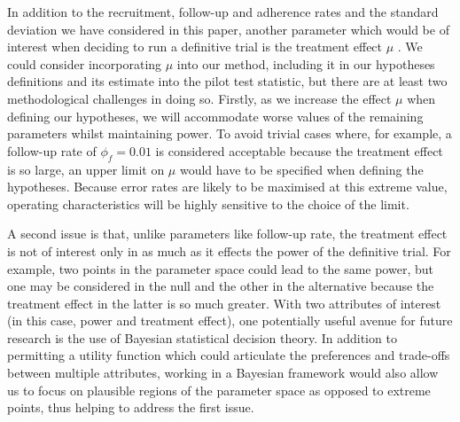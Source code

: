 \documentclass[AMA,STIX1COL]{WileyNJD-v2}
\begin{document}

In addition to the recruitment, follow-up and adherence rates and the standard deviation we have considered in this paper, another parameter which would be of interest when deciding to run a definitive trial is the treatment effect $\mu$ \cite{Wilson2015}. We could consider incorporating $\mu$ into our method, including it in our hypotheses definitions and its estimate into the pilot test statistic, but there are at least two methodological challenges in doing so. Firstly, as we increase the effect $\mu$ when defining our hypotheses, we will accommodate worse values of the remaining parameters whilst maintaining power. To avoid trivial cases where, for example, a follow-up rate of $\phi_f = 0.01$ is considered acceptable because the treatment effect is so large, an upper limit on $\mu$ would have to be specified when defining the hypotheses. Because error rates are likely to be maximised at this extreme value, operating characteristics will be highly sensitive to the choice of the limit.

A second issue is that, unlike parameters like follow-up rate, the treatment effect is not of interest only in as much as it effects the power of the definitive trial. For example, two points in the parameter space could lead to the same power, but one may be considered in the null and the other in the alternative because the treatment effect in the latter is so much greater. With two attributes of interest (in this case, power and treatment effect), one potentially useful avenue for future research is the use of Bayesian statistical decision theory. In addition to permitting a utility function which could articulate the preferences and trade-offs between multiple attributes, working in a Bayesian framework would also allow us to focus on plausible regions of the parameter space as opposed to extreme points, thus helping to address the first issue.

\end{document}
